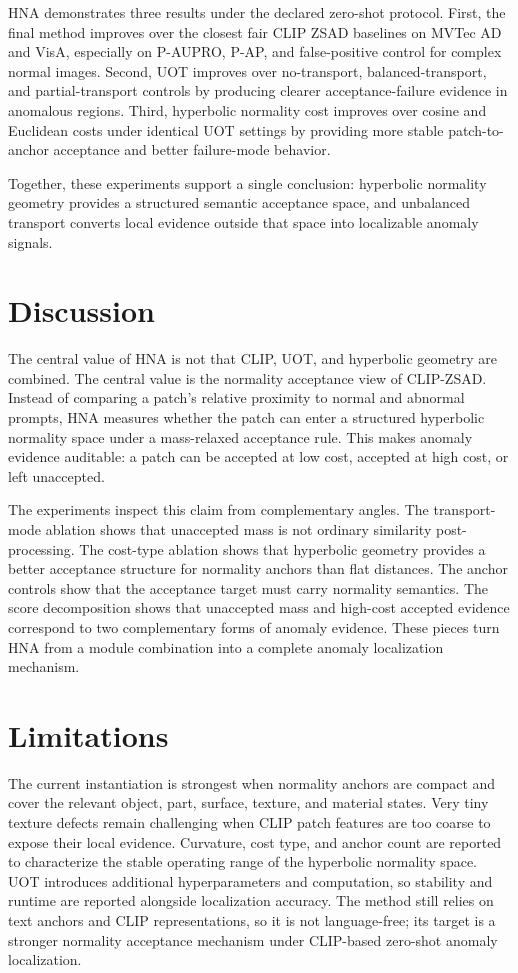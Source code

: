 \documentclass[10pt]{article}
\newcommand{\method}{HNA}
\begin{document}
\method{} demonstrates three results under the declared zero-shot protocol.
First, the final method improves over the closest fair CLIP ZSAD baselines on MVTec AD and VisA, especially on P-AUPRO, P-AP, and false-positive control for complex normal images.
Second, UOT improves over no-transport, balanced-transport, and partial-transport controls by producing clearer acceptance-failure evidence in anomalous regions.
Third, hyperbolic normality cost improves over cosine and Euclidean costs under identical UOT settings by providing more stable patch-to-anchor acceptance and better failure-mode behavior.

Together, these experiments support a single conclusion: hyperbolic normality geometry provides a structured semantic acceptance space, and unbalanced transport converts local evidence outside that space into localizable anomaly signals.

\section{Discussion}

The central value of \method{} is not that CLIP, UOT, and hyperbolic geometry are combined.
The central value is the normality acceptance view of CLIP-ZSAD.
Instead of comparing a patch's relative proximity to normal and abnormal prompts, \method{} measures whether the patch can enter a structured hyperbolic normality space under a mass-relaxed acceptance rule.
This makes anomaly evidence auditable: a patch can be accepted at low cost, accepted at high cost, or left unaccepted.

The experiments inspect this claim from complementary angles.
The transport-mode ablation shows that unaccepted mass is not ordinary similarity post-processing.
The cost-type ablation shows that hyperbolic geometry provides a better acceptance structure for normality anchors than flat distances.
The anchor controls show that the acceptance target must carry normality semantics.
The score decomposition shows that unaccepted mass and high-cost accepted evidence correspond to two complementary forms of anomaly evidence.
These pieces turn \method{} from a module combination into a complete anomaly localization mechanism.

\section{Limitations}

The current instantiation is strongest when normality anchors are compact and cover the relevant object, part, surface, texture, and material states.
Very tiny texture defects remain challenging when CLIP patch features are too coarse to expose their local evidence.
Curvature, cost type, and anchor count are reported to characterize the stable operating range of the hyperbolic normality space.
UOT introduces additional hyperparameters and computation, so stability and runtime are reported alongside localization accuracy.
The method still relies on text anchors and CLIP representations, so it is not language-free; its target is a stronger normality acceptance mechanism under CLIP-based zero-shot anomaly localization.
\end{document}
